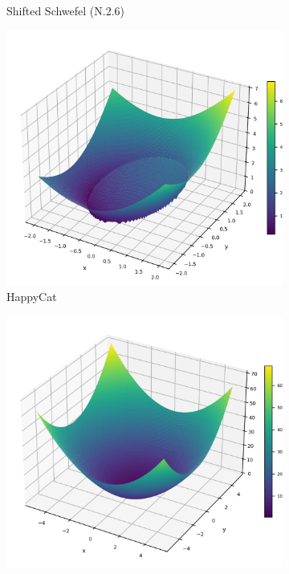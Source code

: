 \begin{figure}[p]
\begin{subfigure}{0.32\textwidth}
        \caption{Shifted Schwefel (N.2.6)}
    \end{subfigure}
    \begin{subfigure}{0.32\textwidth}
        \centering
        \includegraphics[width=1\textwidth]{Figures/benchmark_plots/Happy_Cat_maximized.png}
        \caption{HappyCat}
    \end{subfigure}
    \begin{subfigure}{0.32\textwidth}
        \centering
        \includegraphics[width=1\textwidth]{Figures/benchmark_plots/Shifted_and_Rotated_HGBat_maximized.png}

\end{subfigure}
\end{figure}
